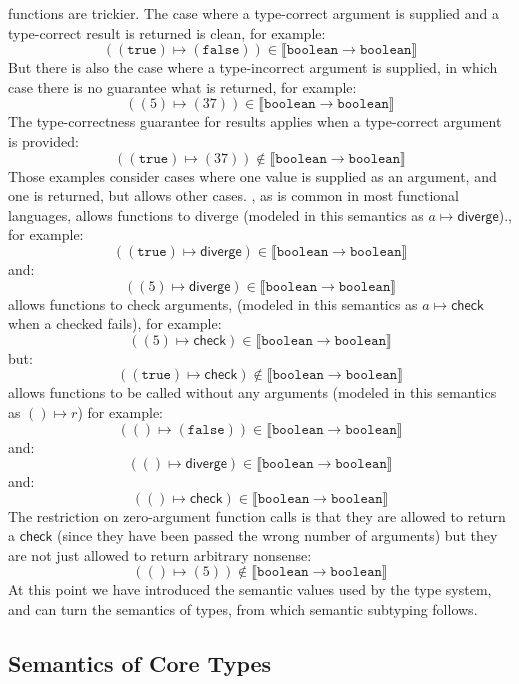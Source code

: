\documentclass[acmsmall,review,screen]{acmart}
\newcommand{\TRUE}{\mathtt{true}}
\newcommand{\FALSE}{\mathtt{false}}
\newcommand{\BOOLEAN}{\mathtt{boolean}}
\newcommand{\DIVERGE}{\mathsf{diverge}}
\newcommand{\CHECK}{\mathsf{check}}
\newcommand{\fun}{\mathbin{\rightarrow}}
\newcommand{\sem}[1]{\llbracket{#1}\rrbracket}
\begin{document}
functions are trickier. The case where a type-correct argument is
supplied and a type-correct result is returned is clean, for example:
\[
  ((\TRUE) \mapsto (\FALSE)) \in \sem{\BOOLEAN \fun \BOOLEAN}
\]
But there is also the case where a type-incorrect argument is
supplied, in which case there is no guarantee what is returned, for example:
\[
  ((5) \mapsto (37)) \in \sem{\BOOLEAN \fun \BOOLEAN}
\]
The type-correctness guarantee for results applies when a type-correct argument is provided:
\[
  ((\TRUE) \mapsto (37)) \not\in \sem{\BOOLEAN \fun \BOOLEAN}
\]
Those examples consider cases where one value is supplied as an argument,
and one is returned, but  allows other cases.
, as is common in most functional languages, allows functions to diverge
(modeled in this semantics as $a \mapsto \DIVERGE$).,
for example:
\[
  ((\TRUE) \mapsto \DIVERGE) \in \sem{\BOOLEAN \fun \BOOLEAN}
\]
and:
\[
  ((5) \mapsto \DIVERGE) \in \sem{\BOOLEAN \fun \BOOLEAN}
\]
 allows functions to check arguments,
(modeled in this semantics as $a \mapsto \CHECK$ when a checked fails),
for example:
\[
  ((5) \mapsto \CHECK) \in \sem{\BOOLEAN \fun \BOOLEAN}
\]
but:
\[
  ((\TRUE) \mapsto \CHECK) \not\in \sem{\BOOLEAN \fun \BOOLEAN}
\]
 allows functions to be called without any arguments
(modeled in this semantics as $() \mapsto r$)
for example:
\[
  (() \mapsto (\FALSE)) \in \sem{\BOOLEAN \fun \BOOLEAN}
\]
and:
\[
  (() \mapsto \DIVERGE) \in \sem{\BOOLEAN \fun \BOOLEAN}
\]
and:
\[
  (() \mapsto \CHECK) \in \sem{\BOOLEAN \fun \BOOLEAN}
\]
The restriction on zero-argument function calls is that they are allowed to return
a $\CHECK$ (since they have been passed the wrong number of arguments)
but they are not just allowed to return arbitrary nonsense:
\[
  (() \mapsto (5)) \not\in \sem{\BOOLEAN \fun \BOOLEAN}
\]
At this point we have introduced the semantic values used by the  type
system, and can turn the semantics of types, from which semantic subtyping follows.

\subsection{Semantics of Core  Types}
\end{document}
